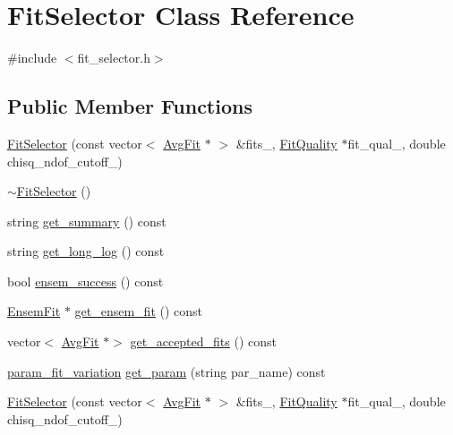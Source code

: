 \hypertarget{classFitSelector}{}\section{Fit\+Selector Class Reference}
\label{classFitSelector}


{\ttfamily \#include $<$fit\+\_\+selector.\+h$>$}

\subsection*{Public Member Functions}
\begin{DoxyCompactItemize}
\item 
\mbox{\hyperlink{classFitSelector_ae27f9d457dfeda289eaf27533c2740fc}{Fit\+Selector}} (const vector$<$ \mbox{\hyperlink{classAvgFit}{Avg\+Fit}} $\ast$ $>$ \&fits\+\_\+, \mbox{\hyperlink{classFitQuality}{Fit\+Quality}} $\ast$fit\+\_\+qual\+\_\+, double chisq\+\_\+ndof\+\_\+cutoff\+\_\+)
\item 
\mbox{\hyperlink{classFitSelector_a346a5fc560a0829bce8f823ee5b51719}{$\sim$\+Fit\+Selector}} ()
\item 
string \mbox{\hyperlink{classFitSelector_adaeea09e76449a7210518347f40a80d5}{get\+\_\+summary}} () const
\item 
string \mbox{\hyperlink{classFitSelector_a9daa811751b4c88fcce1c65c15688b68}{get\+\_\+long\+\_\+log}} () const
\item 
bool \mbox{\hyperlink{classFitSelector_a5f82a02810f58764fa567261d5311744}{ensem\+\_\+success}} () const
\item 
\mbox{\hyperlink{classEnsemFit}{Ensem\+Fit}} $\ast$ \mbox{\hyperlink{classFitSelector_a04446a02122fb9225e758ee9e8218f9c}{get\+\_\+ensem\+\_\+fit}} () const
\item 
vector$<$ \mbox{\hyperlink{classAvgFit}{Avg\+Fit}} $\ast$$>$ \mbox{\hyperlink{classFitSelector_adab655156a6e59ccb556021cb60d038d}{get\+\_\+accepted\+\_\+fits}} () const
\item 
\mbox{\hyperlink{structparam__fit__variation}{param\+\_\+fit\+\_\+variation}} \mbox{\hyperlink{classFitSelector_aa01f927232345b58d1f3bda5631300a1}{get\+\_\+param}} (string par\+\_\+name) const
\item 
\mbox{\hyperlink{classFitSelector_ae27f9d457dfeda289eaf27533c2740fc}{Fit\+Selector}} (const vector$<$ \mbox{\hyperlink{classAvgFit}{Avg\+Fit}} $\ast$ $>$ \&fits\+\_\+, \mbox{\hyperlink{classFitQuality}{Fit\+Quality}} $\ast$fit\+\_\+qual\+\_\+, double chisq\+\_\+ndof\+\_\+cutoff\+\_\+)
$$
\end{DoxyCompactItemize}
